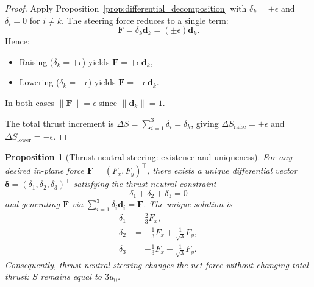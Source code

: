 \documentclass{article}
\newtheorem{proposition}{Proposition}
\begin{document}
\begin{proof}
Apply Proposition~\ref{prop:differential_decomposition} with $\delta_k = \pm\epsilon$ and 
$\delta_i = 0$ for $i \neq k$. The steering force reduces to a single term:
\[
\mathbf F = \delta_k \mathbf d_k = (\pm\epsilon)\mathbf d_k.
\]
Hence:
\begin{itemize}
\item Raising ($\delta_k = +\epsilon$) yields $\mathbf F = +\epsilon\,\mathbf d_k$,
\item Lowering ($\delta_k = -\epsilon$) yields $\mathbf F = -\epsilon\,\mathbf d_k$.
\end{itemize}
In both cases $\|\mathbf F\| = \epsilon$ since $\|\mathbf d_k\| = 1$.

The total thrust increment is $\Delta S = \sum_{i=1}^{3} \delta_i = \delta_k$, giving 
$\Delta S_{\mathrm{raise}} = +\epsilon$ and $\Delta S_{\mathrm{lower}} = -\epsilon$.
\end{proof}


\begin{proposition}[Thrust-neutral steering: existence and uniqueness]
\label{prop:thrust_neutral_unique}
For any desired in-plane force $\mathbf F = (F_x, F_y)^\top$, there exists a \emph{unique} 
differential vector $\bm\delta = (\delta_1, \delta_2, \delta_3)^\top$ satisfying the 
\emph{thrust-neutral constraint}
\begin{equation}
\delta_1 + \delta_2 + \delta_3 = 0
\label{eq:thrust_neutral}
\end{equation}
and generating $\mathbf F$ via $\sum_{i=1}^{3} \delta_i \mathbf d_i = \mathbf F$. 
The unique solution is
\begin{align}
\delta_1 &= \tfrac{2}{3} F_x, \label{eq:delta1} \\
\delta_2 &= -\tfrac{1}{3} F_x + \tfrac{1}{\sqrt{3}} F_y, \label{eq:delta2} \\
\delta_3 &= -\tfrac{1}{3} F_x - \tfrac{1}{\sqrt{3}} F_y. \label{eq:delta3}
\end{align}
Consequently, thrust-neutral steering changes the net force without changing total thrust: 
$S$ remains equal to $3u_0$.
\end{proposition}
\end{document}
